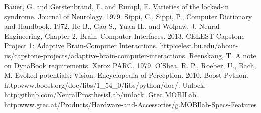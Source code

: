 \documentclass[11pt]{article}
\begin{document}
\begin{thebibliography}{99}
  Bauer, G. and Gerstenbrand, F. and Rumpl, E. Varieties of the locked-in syndrome. Journal of Neurology.  1979.
  Sippi, C.,  Sippi, P., Computer Dictionary and Handbook. 1972. 
  He B., Gao S., Yuan H., and Wolpaw, J.  Neural Engineering, Chapter 2, Brain–Computer Interfaces.  2013.
 CELEST Capstone Project 1: Adaptive Brain-Computer Interactions.  http:\/\/celest.bu.edu/about-us/capstone-projects/adaptive-brain-computer-interactions.
  Reenskaug, T. A note on DynaBook requirements. Xerox PARC.  1979.
 O’Shea, R. P., Roeber, U., Bach, M. Evoked potentials: Vision.  Encyclopedia of Perception. 2010.
 Boost Python.  http:\/\/www.boost.org/doc/libs/1\_54\_0/libs/python/doc/.
 Unlock.  http:\/\/github.com/NeuralProsthesisLab/unlock.
 Gtec MOBILab.  http:\/\/www.gtec.at/Products/Hardware-and-Accessories/g.MOBIlab-Specs-Features

\end{thebibliography}
\end{document}
